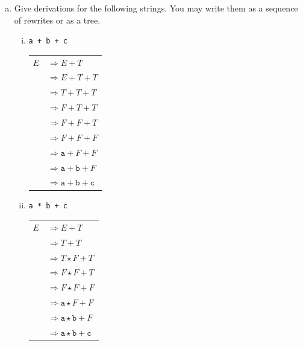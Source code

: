 \documentclass{article}
\begin{document}
        \begin{enumerate}[(a)]
            \item Give derivations for the following strings. You may write them as a sequence of rewrites or as a tree.

                \begin{enumerate}[(i)]
                    \item \texttt{a + b + c}

                        \begin{tabular}{ll}
                            $E$ & $\Longrightarrow E + T$ \\
                              & $\Longrightarrow E + T + T$ \\
                              & $\Longrightarrow T + T + T$ \\
                              & $\Longrightarrow F + T + T$ \\
                              & $\Longrightarrow F + F + T$ \\
                              & $\Longrightarrow F + F + F$ \\
                              & $\Longrightarrow \texttt{a} + F + F$ \\
                              & $\Longrightarrow \texttt{a} + \texttt{b} + F$ \\
                              & $\Longrightarrow \texttt{a} + \texttt{b} + \texttt{c}$
                        \end{tabular}

                    \item \texttt{a * b + c}

                        \begin{tabular}{ll}
                            $E$ & $\Longrightarrow E + T$ \\
                                & $\Longrightarrow T + T$ \\
                                & $\Longrightarrow T \star F + T$ \\
                                & $\Longrightarrow F \star F + T$ \\
                                & $\Longrightarrow F \star F + F$ \\
                                & $\Longrightarrow \texttt{a} \star F + F$ \\
                                & $\Longrightarrow \texttt{a} \star \texttt{b} + F$ \\
                                & $\Longrightarrow \texttt{a} \star \texttt{b} + \texttt{c}$
                        \end{tabular}


\end{enumerate}
\end{enumerate}
\end{document}
